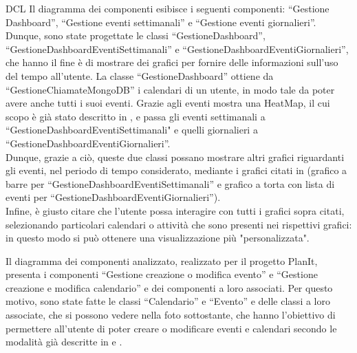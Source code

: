 \begin{listaPersonale}{DCL}
    Il diagramma dei componenti esibisce i seguenti componenti: “Gestione Dashboard”, “Gestione eventi settimanali” e “Gestione eventi giornalieri”. Dunque, sono state progettate le classi “GestioneDashboard”, “GestioneDashboardEventiSettimanali” e “GestioneDashboardEventiGiornalieri”, che hanno il fine è di mostrare dei grafici per fornire delle informazioni sull'uso del tempo all'utente.
    La classe “GestioneDashboard” ottiene da “GestioneChiamateMongoDB” i calendari di un utente, in modo tale da poter avere anche tutti i suoi eventi. Grazie agli eventi mostra una HeatMap, il cui scopo è già stato descritto in , e passa gli eventi settimanali a “GestioneDashboardEventiSettimanali" e quelli giornalieri a “GestioneDashboardEventiGiornalieri”. \\
    Dunque, grazie a ciò, queste due classi possano mostrare altri grafici riguardanti gli eventi, nel periodo di tempo considerato, mediante i grafici citati in  (grafico a barre per “GestioneDashboardEventiSettimanali” e grafico a torta con lista di eventi per “GestioneDashboardEventiGiornalieri”).\\
    Infine, è giusto citare che l'utente possa interagire con tutti i grafici sopra citati, selezionando particolari calendari o attività che sono presenti nei rispettivi grafici: in questo modo si può ottenere una visualizzazione più "personalizzata".


    \begin{center}
        
    \end{center}

    \newpage


    Il diagramma dei componenti analizzato, realizzato per il progetto PlanIt, presenta i componenti “Gestione creazione o modifica evento” e “Gestione creazione e modifica calendario” e dei componenti a loro associati. Per questo motivo, sono state fatte le classi “Calendario” e “Evento” e delle classi a loro associate, che si possono vedere nella foto sottostante, che hanno l'obiettivo di permettere all'utente di poter creare o modificare eventi e calendari secondo le modalità già descritte in  e .



\end{listaPersonale}
